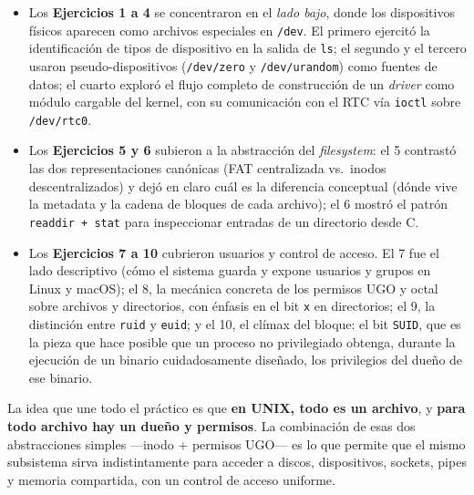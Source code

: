 \documentclass[11pt,a4paper]{article}
\begin{document}
\begin{itemize}[leftmargin=*]
    \item Los \textbf{Ejercicios 1 a 4} se concentraron en el
        \emph{lado bajo}, donde los dispositivos físicos aparecen como
        archivos especiales en \texttt{/dev}. El primero ejercitó la
        identificación de tipos de dispositivo en la salida de
        \texttt{ls}; el segundo y el tercero usaron pseudo-dispositivos
        (\texttt{/dev/zero} y \texttt{/dev/urandom}) como fuentes de
        datos; el cuarto exploró el flujo completo de construcción de
        un \emph{driver} como módulo cargable del kernel, con su
        comunicación con el RTC vía \texttt{ioctl} sobre
        \texttt{/dev/rtc0}.

    \item Los \textbf{Ejercicios 5 y 6} subieron a la abstracción del
        \emph{filesystem}: el 5 contrastó las dos representaciones
        canónicas (FAT centralizada vs.\ inodos descentralizados) y
        dejó en claro cuál es la diferencia conceptual (dónde vive la
        metadata y la cadena de bloques de cada archivo); el 6 mostró
        el patrón \texttt{readdir + stat} para inspeccionar entradas
        de un directorio desde C.

    \item Los \textbf{Ejercicios 7 a 10} cubrieron usuarios y control
        de acceso. El 7 fue el lado descriptivo (cómo el sistema
        guarda y expone usuarios y grupos en Linux y macOS); el 8, la
        mecánica concreta de los permisos UGO y octal sobre archivos
        y directorios, con énfasis en el bit \texttt{x} en
        directorios; el 9, la distinción entre \texttt{ruid} y
        \texttt{euid}; y el 10, el clímax del bloque: el bit
        \texttt{SUID}, que es la pieza que hace posible que un proceso
        no privilegiado obtenga, durante la ejecución de un binario
        cuidadosamente diseñado, los privilegios del dueño de ese
        binario.
\end{itemize}

\begin{idea}
La idea que une todo el práctico es que \textbf{en UNIX, todo es un
archivo}, y \textbf{para todo archivo hay un dueño y permisos}. La
combinación de esas dos abstracciones simples ---inodo + permisos
UGO--- es lo que permite que el mismo subsistema sirva indistintamente
para acceder a discos, dispositivos, sockets, pipes y memoria
compartida, con un control de acceso uniforme.
\end{idea}
\end{document}
